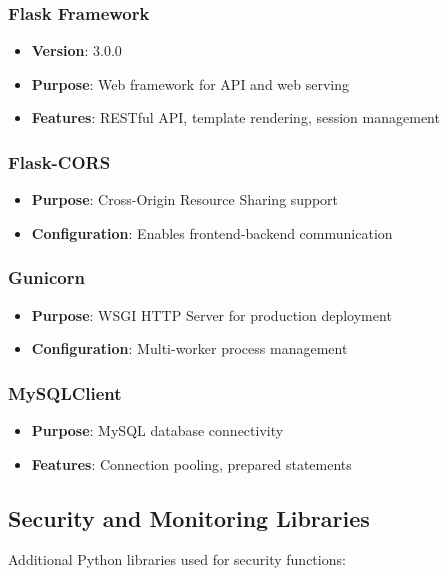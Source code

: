 \documentclass[12pt,a4paper]{report}
\begin{document}
\subsubsection{Flask Framework}
\begin{itemize}
    \item \textbf{Version}: 3.0.0
    \item \textbf{Purpose}: Web framework for API and web serving
    \item \textbf{Features}: RESTful API, template rendering, session management
\end{itemize}

\subsubsection{Flask-CORS}
\begin{itemize}
    \item \textbf{Purpose}: Cross-Origin Resource Sharing support
    \item \textbf{Configuration}: Enables frontend-backend communication
\end{itemize}

\subsubsection{Gunicorn}
\begin{itemize}
    \item \textbf{Purpose}: WSGI HTTP Server for production deployment
    \item \textbf{Configuration}: Multi-worker process management
\end{itemize}

\subsubsection{MySQLClient}
\begin{itemize}
    \item \textbf{Purpose}: MySQL database connectivity
    \item \textbf{Features}: Connection pooling, prepared statements
\end{itemize}

\subsection{Security and Monitoring Libraries}

Additional Python libraries used for security functions:
\end{document}
